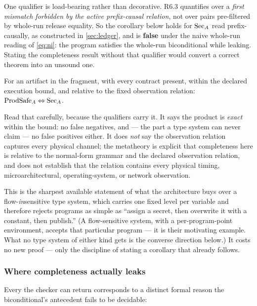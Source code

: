 One qualifier is load-bearing rather than decorative. R6.3 quantifies over a
\emph{first mismatch forbidden by the active prefix-causal relation}, not over
pairs pre-filtered by whole-run release equality. So the corollary below holds
for $\mathrm{Sec}_A$ read prefix-causally, as constructed in \cref{sec:ledger}, and
is \textbf{false} under the naive whole-run reading of \eqref{eq:ni}: the
 program satisfies the whole-run biconditional while
leaking. Stating the completeness result without that qualifier would convert a
correct theorem into an unsound one.

\begin{theorem}
\label{thm:complete}
For an artifact in the fragment, with every contract present, within the declared
execution bound, and relative to the fixed observation relation:
$\mathrm{ProdSafe}_A \Leftrightarrow \mathrm{Sec}_A$.
\end{theorem}

Read that carefully, because the qualifiers carry it. It says the product is
\emph{exact} within the bound: no false negatives, and --- the part a type system
can never claim --- no false positives either. It does \emph{not} say the
observation relation captures every physical channel; the metatheory is explicit
that completeness here is relative to the normal-form grammar and the declared
observation relation, and does not establish that the relation contains every
physical timing, microarchitectural, operating-system, or network observation.

This is the sharpest available statement of what the architecture buys over a
flow-\emph{in}sensitive type system, which carries one fixed level per variable
and therefore rejects programs as simple as ``assign a secret, then overwrite it
with a constant, then publish.'' (A flow-sensitive system, with a per-program-point
environment, accepts that particular program --- it is their motivating example.
What no type system of either kind gets is the converse direction below.)
It costs no new proof --- only the discipline of stating a corollary that already
follows.

\subsubsection*{Where completeness actually leaks}

Every \Unknown{} the checker can return corresponds to a distinct formal reason
the biconditional's antecedent fails to be decidable:

